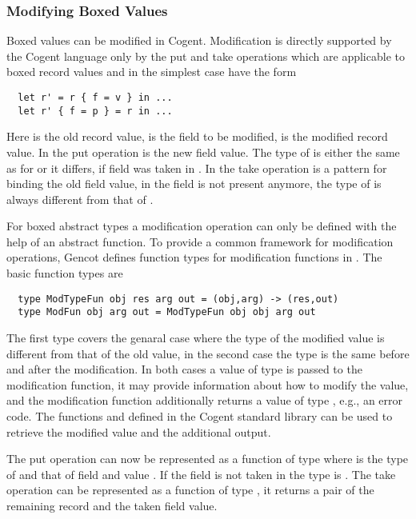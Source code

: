 \subsubsection{Modifying Boxed Values}

Boxed values can be modified in Cogent. Modification is directly supported by the Cogent language only by the put
and take operations which are applicable to boxed record values and in the simplest case have the form
\begin{verbatim}
  let r' = r { f = v } in ...
  let r' { f = p } = r in ...
\end{verbatim}
Here  is the old record value,  is the field to be modified,  is the modified record value.
In the put operation  is the new field value. The type of  is either the same as for  or it
differs, if field  was taken in . In the take operation  is a pattern for binding the old 
field value, in  the field is not present anymore, the type of  is always different from that of .

For boxed abstract types a modification operation can only be defined with the help of an abstract function.
To provide a common framework for modification operations, Gencot defines function types for modification functions 
in . The basic function types are
\begin{verbatim}
  type ModTypeFun obj res arg out = (obj,arg) -> (res,out)
  type ModFun obj arg out = ModTypeFun obj obj arg out
\end{verbatim}
The first type covers the genaral case where the type of the modified value is different from that of the old value, in the second
case the type is the same before and after the modification. In both cases a value of type  is passed to the modification
function, it may provide information about how to modify the value, and the modification function additionally returns a value of
type , e.g., an error code. The functions  and  defined in the Cogent standard library can be used
to retrieve the modified value and the additional output.

The put operation can now be represented as a function of type  where  is the type of
 and  that of field  and value . If the field is not taken in  the type is .
The take operation can be represented as a function of type , it returns 
a pair of the remaining record and the taken field value.

